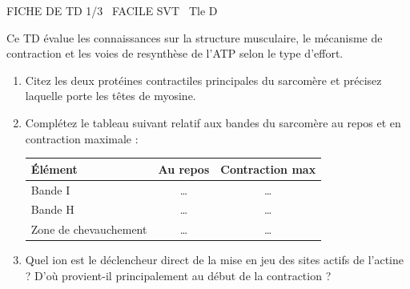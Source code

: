 \documentclass[11pt]{article}
\begin{document}
\begin{tcolorbox}[enhanced,colback=popink,colframe=popink,arc=10pt,boxrule=0pt,left=12pt,right=12pt,top=9pt,bottom=9pt]
{\color{white}\popxbold\small FICHE DE TD 1/3 \textbullet\ FACILE \hfill SVT \textbullet\ Tle D\par}
\end{tcolorbox}
\vspace{4pt}
Ce TD évalue les connaissances sur la structure musculaire, le mécanisme de contraction et les voies de resynthèse de l'ATP selon le type d'effort.

\begin{exercice}
\begin{enumerate}
    \item Citez les deux protéines contractiles principales du sarcomère et précisez laquelle porte les têtes de myosine.
    \item Complétez le tableau suivant relatif aux bandes du sarcomère au repos et en contraction maximale :
    \begin{tabular}{|l|c|c|}
        \hline
        \textbf{Élément} & \textbf{Au repos} & \textbf{Contraction max} \\
        \hline
        Bande I & \dots & \dots \\
        \hline
        Bande H & \dots & \dots \\
        \hline
        Zone de chevauchement & \dots & \dots \\
        \hline
    \end{tabular}
    \item Quel ion est le déclencheur direct de la mise en jeu des sites actifs de l'actine ? D'où provient-il principalement au début de la contraction ?
\end{enumerate}
\end{exercice}
\end{document}
